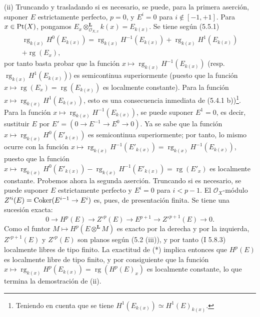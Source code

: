 (ii) Truncando y trasladando si es necesario, se puede, para la primera aserción, suponer \(E\) estrictamente perfecto, \(p=0\), y \(E^i=0\) para \(i\notin[-1,+1]\). Para \(x\in\operatorname{Pt}(X)\), pongamos \(E_x\otimes_{\mathcal O_{X,x}}^{\mathbf L}k(x)=E_{k(x)}\). Se tiene según (5.5.1)
\[
\begin{gathered}
 \operatorname{rg}_{k(x)}H^0(E_{k(x)})=\operatorname{rg}_{k(x)}H^{-1}(E_{k(x)})+\operatorname{rg}_{k(x)}H^1(E_{k(x)})\\
 +\operatorname{rg}(E_x),
\end{gathered}
\]
por tanto basta probar que la función \(x\mapsto\operatorname{rg}_{k(x)}H^{-1}(E_{k(x)})\) (resp. \(\operatorname{rg}_{k(x)}H^1(E_{k(x)})\)) es semicontinua superiormente (puesto que la función \(x\mapsto\operatorname{rg}(E_x)=\operatorname{rg}(E_{k(x)})\) es localmente constante). Para la función \(x\mapsto\operatorname{rg}_{k(x)}H^1(E_{k(x)})\), esto es una consecuencia inmediata de (5.4.1 b))\footnote{Teniendo en cuenta que se tiene \(H^1(E_{k(x)})\simeq H^1(E)_{k(x)}\).}. Para la función \(x\mapsto\operatorname{rg}_{k(x)}H^{-1}(E_{k(x)})\), se puede suponer \(E^1=0\), es decir, sustituir \(E\) por \(E'=(0\to E^{-1}\to E^0\to0)\). Ya se sabe que la función \(x\mapsto\operatorname{rg}_{k(x)}H^0(E'_{k(x)})\) es semicontinua superiormente; por tanto, lo mismo ocurre con la función \(x\mapsto\operatorname{rg}_{k(x)}H^{-1}(E'_{k(x)})=\operatorname{rg}_{k(x)}H^{-1}(E_{k(x)})\), puesto que la función \(x\mapsto\operatorname{rg}_{k(x)}H^0(E'_{k(x)})-\operatorname{rg}_{k(x)}H^{-1}(E'_{k(x)})=\operatorname{rg}(E'_x)\) es localmente constante. Probemos ahora la segunda aserción. Truncando si es necesario, se puede suponer \(E\) estrictamente perfecto y \(E^i=0\) para \(i<p-1\). El \(\mathcal O_X\)-módulo \(Z'^i(E)=\operatorname{Coker}(E^{i-1}\to E^i)\) es, pues, de presentación finita. Se tiene una sucesión exacta:
\begin{equation}
 0\to H^p(E)\to Z'^p(E)\to E^{p+1}\to Z'^{p+1}(E)\to0.\tag{$*$}
\end{equation}
Como el funtor \(M\mapsto H^p(E\otimes^{\mathbf L}M)\) es exacto por la derecha y por la izquierda, \(Z'^{p+1}(E)\) y \(Z'^p(E)\)\sisi{)}{} son planos según (5.2 (iii)), y por tanto (I 5.8.3) localmente libres de tipo finito. La exactitud de (*) implica entonces que \(H^p(E)\) es localmente libre de tipo finito, y por consiguiente que la función \(x\mapsto\operatorname{rg}_{k(x)}H^p(E_{k(x)})=\operatorname{rg}(H^p(E)_x)\) es localmente constante, lo que termina la demostración de (ii).

